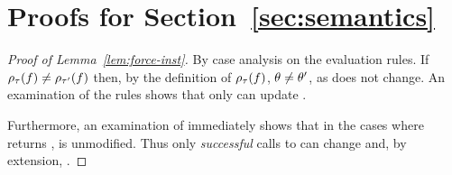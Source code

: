\section{Proofs for Section~\ref{sec:semantics}}
\label{sec:proofs}

\begin{proof}[Proof of Lemma~\ref{lem:force-inst}]
  By case analysis on the evaluation rules.
  If $\rho_{\tau}(f) \neq \rho_{\tau'}(f)$ then,
  by the definition of $\rho_{\tau}(f)$, $\theta \neq \theta'$, as \thole
  does not change.
  An examination of the rules shows that only \forcesym can update \tsu.


  Furthermore, an examination of \forcesym immediately shows that in the
  cases where \forcesym returns \stuck, \tsu is unmodified. Thus only
  \emph{successful} calls to \forcesym can change \tsu and, by
  extension, .





\end{proof}
